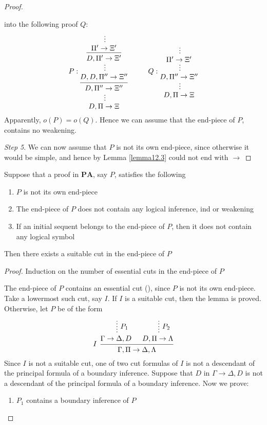 \documentclass[11pt]{article}
\def \PA {\textbf{PA}}
\begin{document}
\begin{enumerate}
\begin{proof}
\begin{enumerate}
into the following proof \(Q\):
\begin{equation*}
P:
\begin{prooftree}%
\hypo{}
\ellipsis{}{\Pi'\to\Xi'}
\infer1{D,\Pi'\to\Xi'}
\ellipsis{}{D,D,\Pi''\to\Xi''}
\infer1{D,\Pi''\to\Xi''}
\ellipsis{}{D,\Pi\to\Xi}
\end{prooftree}\hspace{1cm}
Q:
\begin{prooftree}%
\hypo{}
\ellipsis{}{\Pi'\to\Xi'}
\ellipsis{}{D,\Pi''\to\Xi''}
\ellipsis{}{D,\Pi\to\Xi}
\end{prooftree}
\end{equation*}
Apparently, \(o(P)=o(Q)\). Hence we can assume that the end-piece of \(P\), contains no
weakening.
\end{enumerate}


\emph{Step 5}. We can now assume that \(P\) is not its own end-piece, since otherwise it would be
simple, and hence by Lemma \ref{lemma12.3} could not end with \(\to\)
\end{proof}

\begin{lemma}[sublemma]
Suppose that a proof in \(\PA\), say \(P\), satisfies the following
\begin{enumerate}
\item \(P\) is not its own end-piece
\item The end-piece of \(P\) does not contain any logical inference, ind or weakening
\item If an initial sequent belongs to the end-piece of \(P\), then it does not contain any
logical symbol
\end{enumerate}


Then there exists a suitable cut in the end-piece of \(P\)
\end{lemma}

\begin{proof}
Induction on the number of essential cuts in the end-piece of \(P\)

The end-piece of \(P\) contains an essential cut (\label{Problem5}), since \(P\) is not its own
end-piece. Take a lowermost such cut, say \(I\). If \(I\) is a suitable cut, then the lemma is
proved. Otherwise, let \(P\) be of the form
\begin{equation*}
\begin{prooftree}%
\hypo{}
\ellipsis{\(P_1\)}{\Gamma \to \Delta,D}
\hypo{}
\ellipsis{\(P_2\)}{D,\Pi \to \Lambda}
\infer[left label=\(I\)]2{\Gamma,\Pi \to \Delta,\Lambda}
\end{prooftree}
\end{equation*}
Since \(I\) is not a suitable cut, one of two cut formulas of \(I\) is not a descendant of the
principal formula of a boundary inference. Suppose that \(D\) in \(\Gamma \to \Delta,D\) is not a descendant
of the principal formula of a boundary inference. Now we prove:
\begin{enumerate}
\item \(P_1\) contains a boundary inference of \(P\)


\end{enumerate}
\end{proof}
\end{enumerate}
\end{document}
